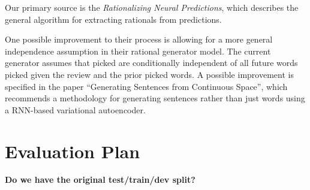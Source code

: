 \documentclass{article}
\begin{document}
Our primary source is the \textit{Rationalizing Neural Predictions}, which
describes the general algorithm for extracting rationals from predictions.

One possible improvement to their process is allowing for a more general
independence assumption in their rational generator model. The current generator
assumes that picked are conditionally independent of all future words picked
given the review and the prior picked words. A possible improvement is specified
in the paper ``Generating Sentences from Continuous Space'', which recommends a
methodology for generating sentences rather than just words using a RNN-based
variational autoencoder.

\section*{Evaluation Plan}

\textbf{Do we have the original test/train/dev split?}

% 
% 
\end{document}
